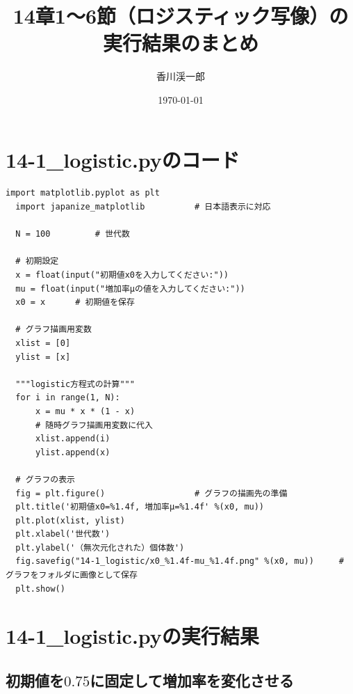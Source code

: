 \documentclass[a4paper, oneside]{jsarticle}
\begin{document}
\title{14章1〜6節（ロジスティック写像）の実行結果のまとめ}
\author{香川渓一郎}
\date{\today}

\maketitle

\setcounter{tocdepth}{1}
\tableofcontents

\section{14-1\_logistic.pyのコード}

\begin{lstlisting}[caption=14-1\_logistic.py, label=logistic]
  import matplotlib.pyplot as plt
  import japanize_matplotlib          # 日本語表示に対応
  
  N = 100         # 世代数
  
  # 初期設定
  x = float(input("初期値x0を入力してください:"))
  mu = float(input("増加率μの値を入力してください:"))
  x0 = x      # 初期値を保存
  
  # グラフ描画用変数
  xlist = [0]
  ylist = [x]
  
  """logistic方程式の計算"""
  for i in range(1, N):
      x = mu * x * (1 - x)
      # 随時グラフ描画用変数に代入
      xlist.append(i)
      ylist.append(x)
  
  # グラフの表示
  fig = plt.figure()                  # グラフの描画先の準備
  plt.title('初期値x0=%1.4f, 増加率μ=%1.4f' %(x0, mu))
  plt.plot(xlist, ylist)
  plt.xlabel('世代数')
  plt.ylabel('（無次元化された）個体数')
  fig.savefig("14-1_logistic/x0_%1.4f-mu_%1.4f.png" %(x0, mu))     # グラフをフォルダに画像として保存
  plt.show()
\end{lstlisting}

\section{14-1\_logistic.pyの実行結果}
\subsection{初期値を$0.75$に固定して増加率を変化させる}
\end{document}
